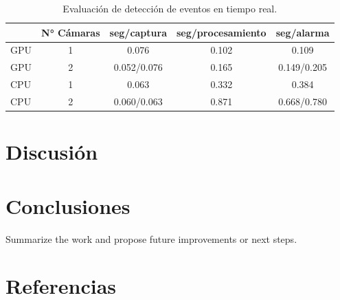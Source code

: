 \documentclass[11pt,a4paper]{article}
\begin{document}
\begin{table}
    \centering
    \begin{tabular}{lcccc}
        \toprule
            & N° Cámaras & seg/captura & seg/procesamiento & seg/alarma  \\
        \midrule
        GPU & 1          & 0.076       & 0.102             & 0.109       \\
        GPU & 2          & 0.052/0.076 & 0.165             & 0.149/0.205 \\
        CPU & 1          & 0.063       & 0.332             & 0.384       \\
        CPU & 2          & 0.060/0.063 & 0.871             & 0.668/0.780 \\
        \bottomrule
    \end{tabular}
    \caption{Evaluación de detección de eventos en tiempo real.}
\end{table}

\section{Discusión}

\section{Conclusiones}

Summarize the work and propose future improvements or next steps.

\section*{Referencias}
\printbibliography
\end{document}

